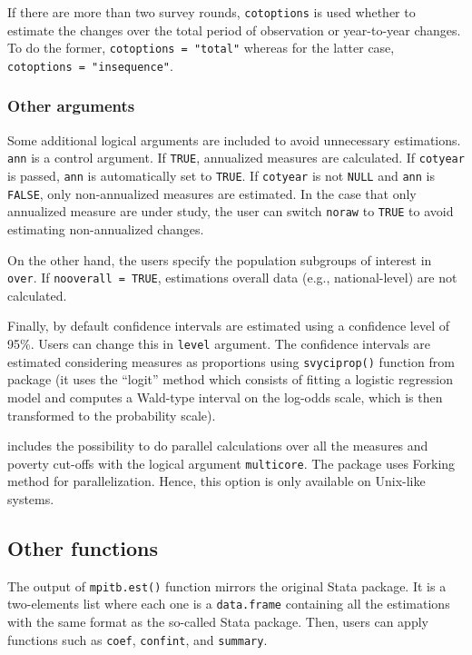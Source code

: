If there are more than two survey rounds, \texttt{cotoptions} is used whether
to estimate the changes over the total period of observation or
year-to-year changes. To do the former, \texttt{cotoptions\ =\ "total"} whereas
for the latter case, \texttt{cotoptions\ =\ "insequence"}.

\hypertarget{other-arguments}{%
\subsubsection{Other arguments}\label{other-arguments}}

Some additional logical arguments are included to avoid unnecessary
estimations. \texttt{ann} is a control argument. If \texttt{TRUE}, annualized measures
are calculated. If \texttt{cotyear} is passed, \texttt{ann} is automatically set to
\texttt{TRUE}. If \texttt{cotyear} is not \texttt{NULL} and \texttt{ann} is \texttt{FALSE}, only
non-annualized measures are estimated. In the case that only annualized
measure are under study, the user can switch \texttt{noraw} to \texttt{TRUE} to avoid
estimating non-annualized changes.

On the other hand, the users specify the population subgroups of
interest in \texttt{over}. If \texttt{nooverall\ =\ TRUE}, estimations overall data
(e.g., national-level) are not calculated.

Finally, by default confidence intervals are estimated using a
confidence level of 95\%. Users can change this in \texttt{level} argument. The
confidence intervals are estimated considering measures as proportions
using \texttt{svyciprop()} function from  package (it uses the
``logit'' method which consists of fitting a logistic regression model and
computes a Wald-type interval on the log-odds scale, which is then
transformed to the probability scale).

 includes the possibility to do parallel calculations over
all the measures and poverty cut-offs with the logical argument
\texttt{multicore}. The package uses Forking method for parallelization. Hence,
this option is only available on Unix-like systems.

\hypertarget{other-functions}{%
\subsection{Other functions}\label{other-functions}}

The output of \texttt{mpitb.est()} function mirrors the original Stata package.
It is a two-elements list where each one is a \texttt{data.frame} containing
all the estimations with the same format as the so-called Stata package.
Then, users can apply functions such as \texttt{coef}, \texttt{confint}, and \texttt{summary}.

